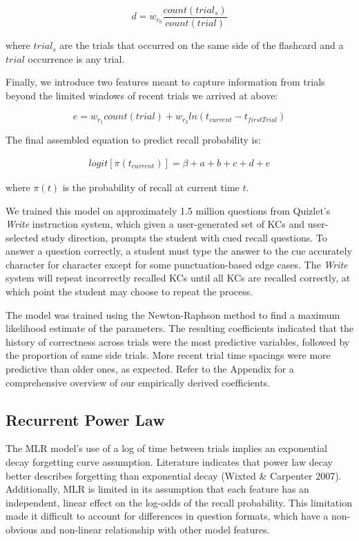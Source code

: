 \documentclass[a4paper,12pt]{article}
\begin{document}
\begin{equation}
d = w_{r_0} \frac{count(trial_s)}{count(trial)}
\end{equation}

where $trial_s$ are the trials that occurred on the same side of the flashcard and a $trial$ occurrence is any trial.
	
Finally, we introduce two features meant to capture information from trials beyond the limited windows of recent trials we arrived at above:

\begin{equation}
e = w_{r_1} count(trial) + w_{r_2} ln(t_{current} - t_{firstTrial})
\end{equation}

The final assembled equation to predict recall probability is:

\begin{equation}
\begin{split}
logit[\pi(t_{current})] = \beta + a + b + c + d + e
\end{split}
\end{equation}
	
where $\pi(t)$ is the probability of recall at current time $t$.

We trained this model on approximately 1.5 million questions from Quizlet's \textit{Write} instruction system, which given a user-generated set of KCs and user-selected study direction, prompts the student with cued recall questions. To answer a question correctly, a student must type the answer to the cue accurately character for character except for some punctuation-based edge cases. The \textit{Write} system will repeat incorrectly recalled KCs until all KCs are recalled correctly, at which point the student may choose to repeat the process.
	
The model was trained using the Newton-Raphson method to find a maximum likelihood estimate of the parameters. The resulting coefficients indicated that the history of correctness across trials were the most predictive variables, followed by the proportion of same side trials. More recent trial time spacings were more predictive than older ones, as expected. Refer to the Appendix for a comprehensive overview of our empirically derived coefficients. 

\subsection{Recurrent Power Law}
The MLR model's use of a log of time between trials implies an exponential decay forgetting curve assumption. Literature indicates that power law decay better describes forgetting than exponential decay (Wixted \& Carpenter 2007). Additionally, MLR is limited in its assumption that each feature has an independent, linear effect on the log-odds of the recall probability. This limitation made it difficult to account for differences in question formats, which have a non-obvious and non-linear relationship with other model features.
\end{document}
